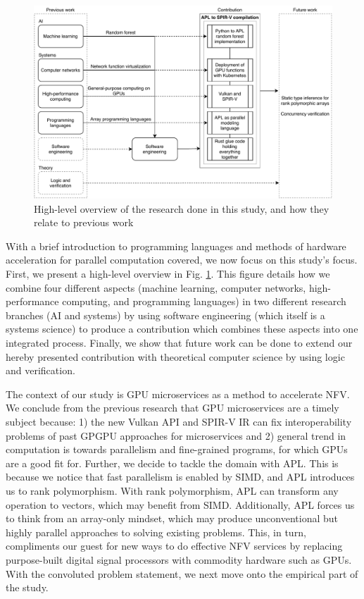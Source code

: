 \documentclass{IEEEtran}
\begin{document}
\begin{figure}
  \centering
  \includegraphics[width=\columnwidth*2]{./assets/overview.pdf}
  \caption{High-level overview of the research done in this study, and how they relate to previous work}
  \label{fig:ov}
\end{figure}

With a brief introduction to programming languages and methods of hardware acceleration for parallel computation covered, we now focus on this study's focus. First, we present a high-level overview in Fig. \ref{fig:ov}. This figure details how we combine four different aspects (machine learning, computer networks, high-performance computing, and programming languages) in two different research branches (AI and systems) by using software engineering (which itself is a systems science) to produce a contribution which combines these aspects into one integrated process. Finally, we show that future work can be done to extend our hereby presented contribution with theoretical computer science by using logic and verification.

The context of our study is GPU microservices as a method to accelerate \gls{NFV}. We conclude from the previous research that GPU microservices are a timely subject because: 1) the new Vulkan API and SPIR-V IR can fix interoperability problems of past GPGPU approaches for microservices and 2) general trend in computation is towards parallelism and fine-grained programs, for which GPUs are a good fit for. Further, we decide to tackle the domain with APL. This is because we notice that fast parallelism is enabled by \gls{SIMD}, and APL introduces us to rank polymorphism. With rank polymorphism, APL can transform any operation to vectors, which may benefit from \gls{SIMD}. Additionally, APL forces us to think from an array-only mindset, which may produce unconventional but highly parallel approaches to solving existing problems. This, in turn, compliments our guest for new ways to do effective \gls{NFV} services by replacing purpose-built digital signal processors with commodity hardware such as GPUs. With the convoluted problem statement, we next move onto the empirical part of the study.
\end{document}
